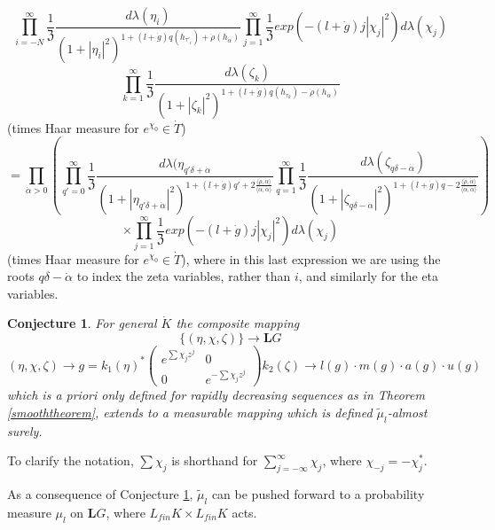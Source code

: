 \documentclass{amsart}
\theoremstyle{conjecture}
\newtheorem{conjecture}{Conjecture}
\theoremstyle{definition}
\theoremstyle{question}
\theoremstyle{questions}
\theoremstyle{remark}
\theoremstyle{remarks}
\theoremstyle{example}
\numberwithin{equation}{section}
\begin{document}
\begin{equation}\label{productmeasure4}\prod_{i=-N}^{\infty}\frac{1}{\mathfrak Z} \frac{d\lambda(\eta_i)}{(1+|\eta_i|^2)^{1+(l+\dot g)q(h_{\tau'_i})+\dot\rho(h_{\dot \alpha})}}  \prod_{j=1}^{\infty} \frac{1}{\mathfrak Z} exp(- (l+\dot g)j|\chi_j|^2  )d\lambda(\chi_j) \end{equation}
$$ \prod_{k=1}^{\infty}\frac{1}{\mathfrak Z} \frac{d\lambda(\zeta_k)}{(1+|\zeta_k|^2)^{1+(l+\dot g)q(h_{\tau_k})-\dot \rho(h_{\dot\alpha})}} $$
(times Haar measure for $e^{\chi_0}\in \dot T$)
\begin{equation}\label{productmeasure5}=\prod_{\dot\alpha>0}\left(\prod_{q'=0}^{\infty}\frac{1}{\mathfrak Z} \frac{d\lambda(\eta_{q'\delta+\dot\alpha}}{(1+|\eta_{q'\delta+\dot{\alpha}}|^2)^{1+(l+\dot g)q'+2\frac{\langle\dot\rho,\dot\alpha\rangle}{\langle\dot\alpha,\dot\alpha\rangle}}} \prod_{q=1}^{\infty}\frac{1}{\mathfrak Z} \frac{d\lambda(\zeta_{q\delta-\dot\alpha})}{(1+|\zeta_{q\delta-\dot{\alpha}}|^2)^{1+(l+\dot g)q-2\frac{\langle\dot\rho,\dot\alpha\rangle}{\langle\dot\alpha,\dot\alpha\rangle}}}\right)\end{equation}
 $$\times \prod_{j=1}^{\infty} \frac{1}{\mathfrak Z} exp(- (l+\dot g)j|\chi_j|^2  )d\lambda(\chi_j) $$
(times Haar measure for $e^{\chi_0}\in \dot T$), where in this last expression we are using the roots
$q\delta-\dot{\alpha}$ to index the zeta variables, rather than $i$, and similarly for the eta variables.


\begin{conjecture}\label{conj7} For general $\dot K$
the composite mapping
\begin{equation}\label{mapping}\{(\eta,\chi,\zeta)\} \to \mathbf
LG \end{equation}
$$(\eta,\chi,\zeta) \to g=k_1(\eta)^*\left(\begin{matrix}e^{\sum\chi_jz^j}&0\\0&e^{-\sum\chi_jz^j}\end{matrix}\right)k_2(\zeta)
\to l(g)\cdot m(g)\cdot a(g)\cdot u(g)$$ which is a priori only
defined for rapidly decreasing sequences as in Theorem \ref{smooththeorem}, extends to a measurable
mapping which is defined $\tilde{\mu}_l$-almost surely.
\end{conjecture}

To clarify the notation, $\sum \chi_j$ is shorthand for $\sum_{j=-\infty}^{\infty}\chi_j$, where $\chi_{-j}=-\chi_j^*$.

As a consequence of Conjecture \ref{conj7},
$\tilde{\mu}_l$ can be pushed forward to a probability measure
$\mu_l$ on $\mathbf LG$, where $L_{fin}K \times
L_{fin}K$ acts.
\end{document}
